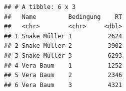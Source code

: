 \documentclass[
]{book}
\begin{document}
\begin{verbatim}
## # A tibble: 6 x 3
##   Name         Bedingung    RT
##   <chr>        <chr>     <dbl>
## 1 Snake Müller 1          2624
## 2 Snake Müller 2          3902
## 3 Snake Müller 3          6293
## 4 Vera Baum    1          1252
## 5 Vera Baum    2          2346
## 6 Vera Baum    3          4321
\end{verbatim}

  
\end{document}
